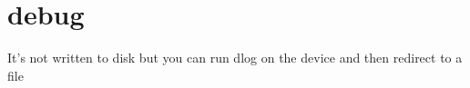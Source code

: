 \section{debug}

It's not written to disk but you can run dlog on the device and then redirect to a file